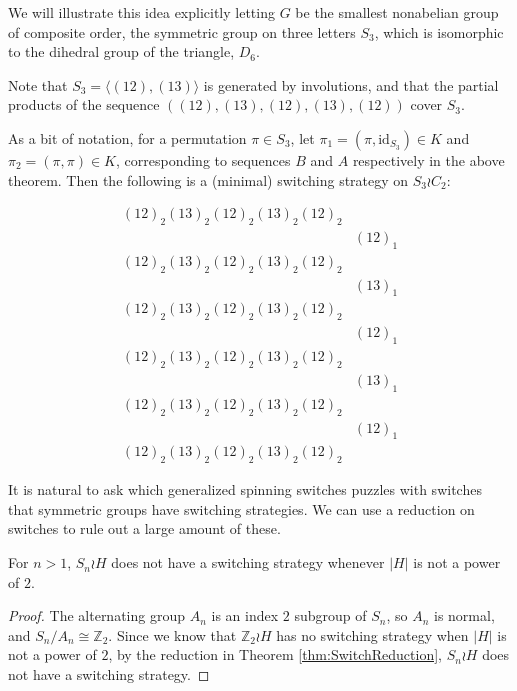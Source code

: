 We will illustrate this idea explicitly letting $G$ be the smallest nonabelian
group of composite order, the symmetric group on three letters $S_3$, which is
isomorphic to the dihedral group of the triangle, $D_6$.
\begin{example}
  Note that $S_3 = \langle(12), (13)\rangle$ is generated by involutions, and
  that the partial products of the sequence $((12),(13),(12),(13),(12))$
  cover $S_3$.

  As a bit of notation, for a permutation $\pi \in S_3$, let
  $\pi_1 = (\pi, \mathrm{id}_{S_3}) \in K$
  and
  $\pi_2 = (\pi, \pi) \in K$, corresponding to sequences $B$ and $A$
  respectively in the above theorem.
  Then the following is a (minimal) switching strategy on $S_3 \wr C_2$:
  \begin{singlespace}
  \begin{align*}
    (12)_2(13)_2(12)_2(13)_2(12)_2 \\
    &(12)_1 \\
    (12)_2(13)_2(12)_2(13)_2(12)_2 \\
    &(13)_1 \\
    (12)_2(13)_2(12)_2(13)_2(12)_2 \\
    &(12)_1 \\
    (12)_2(13)_2(12)_2(13)_2(12)_2 \\
    &(13)_1 \\
    (12)_2(13)_2(12)_2(13)_2(12)_2 \\
    &(12)_1 \\
    (12)_2(13)_2(12)_2(13)_2(12)_2
  \end{align*}
  \end{singlespace}
  \label{ex:TwoSymmetricGroups}
\end{example}
It is natural to ask which generalized spinning switches puzzles with
switches that symmetric groups have switching strategies. We can use a
reduction on switches to rule out a large amount of these.
\begin{proposition}
  For $n > 1$, $S_n \wr H$ does not have a switching strategy whenever
  $|H|$ is not a power of $2$.
\end{proposition}
\begin{proof}
  The alternating group $A_n$ is an index $2$ subgroup of $S_n$, so $A_n$ is
  normal, and $S_n/A_n \cong \mathbb Z_2$.
  Since we know that $\mathbb Z_2 \wr H$ has no switching strategy when
  $|H|$ is not a power of $2$,
  by the reduction in Theorem \ref{thm:SwitchReduction}, $S_n \wr H$ does
  not have a switching strategy.
\end{proof}

